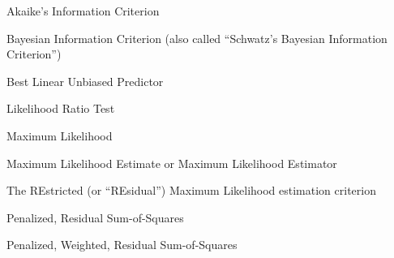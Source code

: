 \begin{description}[PWRSS]
\item[AIC]{Akaike's Information Criterion}
\item[BIC]{Bayesian Information Criterion (also called ``Schwatz's
    Bayesian Information Criterion'')}
\item[BLUP]{Best Linear Unbiased Predictor}
\item[LRT]{Likelihood Ratio Test}
\item[ML]{Maximum Likelihood}
\item[MLE]{Maximum Likelihood Estimate or Maximum Likelihood Estimator}
\item[REML]{The REstricted (or ``REsidual'') Maximum Likelihood
    estimation criterion}
\item[PRSS]{Penalized, Residual Sum-of-Squares}
\item[PWRSS]{Penalized, Weighted, Residual Sum-of-Squares}
\end{description}
